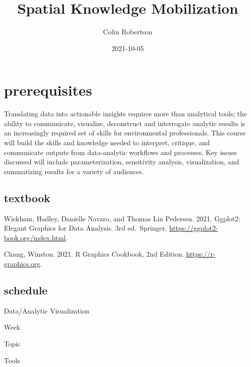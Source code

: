\documentclass[
]{book}
\title{Spatial Knowledge Mobilization}
\author{Colin Robertson}
\date{2021-10-05}
\begin{document}
\maketitle

{
\setcounter{tocdepth}{1}
\tableofcontents
}
\hypertarget{prerequisites}{%
\chapter{prerequisites}\label{prerequisites}}

Translating data into actionable insights requires more than analytical tools; the ability to communicate, visualize, deconstruct and interrogate analytic results is an increasingly required set of skills for environmental professionals. This course will build the skills and knowledge needed to interpret, critique, and communicate outputs from data-analytic workflows and processes. Key issues discussed will include parameterization, sensitivity analysis, visualization, and summarizing results for a variety of audiences.

\hypertarget{textbook}{%
\section{textbook}\label{textbook}}

Wickham, Hadley, Danielle Navaro, and Thomas Lin Pedersen. 2021. Ggplot2: Elegant Graphics for Data Analysis. 3rd ed.~Springer. \url{https://ggplot2-book.org/index.html}.

Chang, Winston. 2021. R Graphics Cookbook, 2nd Edition. \url{https://r-graphics.org}.

\hypertarget{schedule}{%
\section{schedule}\label{schedule}}

Data/Analytic Visualization

Week

Topic

Tools
\end{document}
